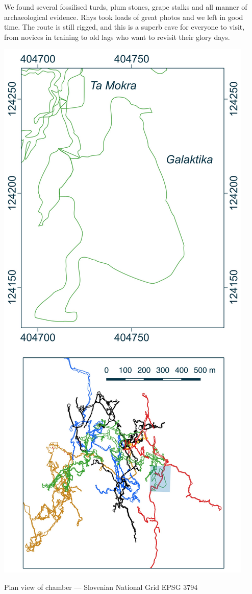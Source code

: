 We found several fossilised turds, plum stones, grape stalks and all manner of archaeological evidence. Rhys took loads of great photos and we left in good time. The route is still rigged, and this is a superb cave for everyone to visit, from novices in training to old lags who want to revisit their glory days.



\begin{marginfigure}
\includegraphics[width=\linewidth]{images/little_insets/galaktika_inset.pdf}
\label{Ta Mokra}
\caption*{ Plan view of    \protect{} chamber --- Slovenian National Grid EPSG 3794}
\end{marginfigure}